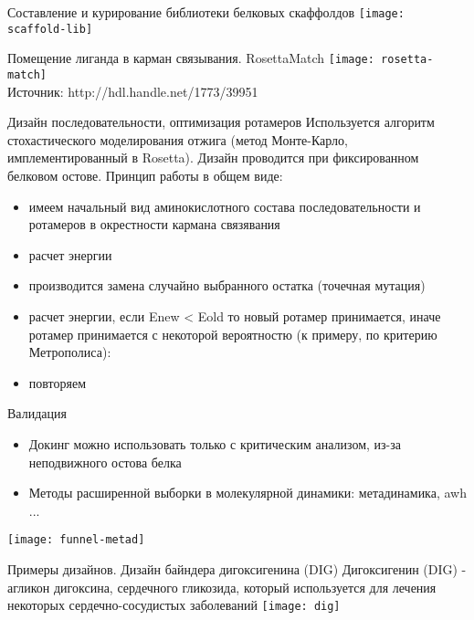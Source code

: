 \begin{frame}{Составление и курирование библиотеки белковых
скаффолдов}
\texttt{[image: scaffold-lib]}
\end{frame}

\begin{frame}{Помещение лиганда в карман связывания. RosettaMatch}
    \texttt{[image: rosetta-match]}\\
    Источник: http://hdl.handle.net/1773/39951
\end{frame}

\begin{frame}{Дизайн последовательности, оптимизация ротамеров}
    Используется алгоритм стохастического моделирования отжига
    (метод Монте-Карло, имплементированный в Rosetta). Дизайн
    проводится при фиксированном белковом остове.
    Принцип работы в общем виде:
    \begin{itemize}
        \item  имеем начальный вид аминокислотного состава последовательности и ротамеров в окрестности кармана связявания
        \item  расчет энергии
        \item производится замена случайно выбранного остатка (точечная мутация)
        \item  расчет энергии,   если Enew < Eold то новый ротамер принимается, иначе ротамер принимается с некоторой вероятностю (к
    примеру, по критерию Метрополиса):
        \item  повторяем
    \end{itemize}
\end{frame}

\begin{frame}{Валидация}
\begin{itemize}
    \item Докинг можно использовать только с критическим анализом, из-за неподвижного остова белка
    \item Методы расширенной выборки в молекулярной динамики: метадинамика, awh ...
\end{itemize}
\texttt{[image: funnel-metad]}
\end{frame}
    

\begin{frame}{Примеры дизайнов. Дизайн байндера дигоксигенина (DIG)}
    Дигоксигенин (DIG) - агликон дигоксина, сердечного
    гликозида, который используется для лечения
    некоторых сердечно-сосудистых заболеваний
    \texttt{[image: dig]}
\end{frame}

